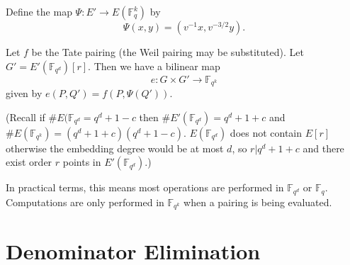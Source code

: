 Define the map $\Psi:E'\rightarrow E(\mathbb{F}_q^k)$ by
\[ \Psi(x,y) = (v^{-1}x, v^{-3/2}y) . \]

Let $f$ be the Tate pairing (the Weil pairing may be substituted).
Let $G' = E'(\mathbb{F}_{q^d})[r]$. Then we have a bilinear map
\[ e : G \times G' \rightarrow \mathbb{F}_{q^k} \]
given by $e(P, Q') = f(P, \Psi(Q'))$.

(Recall if $\#E(\mathbb{F}_{q^d} = q^d + 1 - c$ then
$\#E'(\mathbb{F}_{q^d}) = q^d + 1 + c$ and
$\#E(\mathbb{F}_{q^k}) = (q^{d} + 1 + c)(q^{d} + 1 - c)$.
$E(\mathbb{F}_{q^d})$ does not contain $E[r]$ otherwise the embedding
degree would be at most $d$, so $r | q^{d} + 1 + c$ and
there exist order $r$ points in $E'(\mathbb{F}_{q^d})$.)

In practical terms, this means most operations are performed in
$\mathbb{F}_{q^d}$  or $\mathbb{F}_q$. Computations are only performed in
$\mathbb{F}_{q^k}$ when a pairing is being evaluated.

\section {Denominator Elimination}
